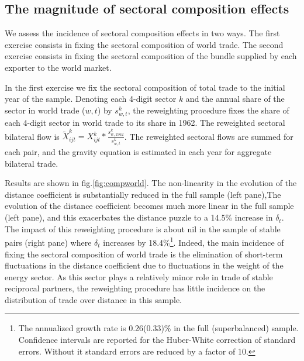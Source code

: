 \documentclass[12pt,twoside,a4paper,notitlepage]{article}
\begin{document}
\subsection{The magnitude of sectoral composition effects} \label{subsec:robustpuzzle}
We assess the incidence of sectoral composition effects in two ways. The first exercise consists in fixing the sectoral composition of world trade. The second exercise consists in fixing the sectoral composition of the bundle supplied by each exporter to the world market. 

In the first exercise we fix the sectoral composition of total trade to the initial year of the sample. 
Denoting each 4-digit sector $k$ and the annual share of the sector in world trade ($w,t$) by $s^{k}_{w,t}$, the reweighting procedure fixes the share of each 4-digit sector in world trade to its share in 1962. The reweighted sectoral bilateral flow is $\tilde{X}^k_{ijt}=X^k_{ijt}*\frac{s^k_{w,1962}}{s^k_{w,t}}$. The reweighted sectoral flows are summed for each pair, and the gravity equation is estimated in each year for aggregate bilateral trade. 

Results are shown in fig.\ref{fig:compworld}.  The non-linearity in the evolution of the distance coefficient is substantially reduced in the full sample (left pane),\fi The evolution of the distance coefficient becomes much more linear in the full sample (left pane), and this exacerbates the distance puzzle to a 14.5\% increase in $\delta_t$. The impact of this reweighting procedure is about nil in the sample of stable pairs (right pane) where $\delta_t$ increases by 18.4\%\footnote{The annualized growth rate is 0.26(0.33)\% in the full (superbalanced) sample. Confidence intervals are reported for the Huber-White correction of standard errors. Without it standard errors are reduced by a factor of 10.}. Indeed, the main incidence of fixing the sectoral composition of world trade is the elimination of short-term fluctuations in the distance coefficient due to fluctuations in the weight of the energy sector. As this sector plays a relatively minor role in trade of stable reciprocal partners, the reweighting procedure has little incidence on the distribution of trade over distance in this sample.
\end{document}
